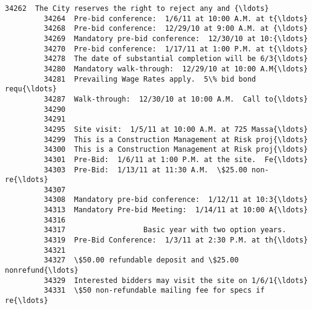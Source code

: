 \documentclass[11pt]{article}
\begin{document}
\begin{Verbatim}[commandchars=\\\{\}]
         34262  The City reserves the right to reject any and {\ldots}   
         34264  Pre-bid conference:  1/6/11 at 10:00 A.M. at t{\ldots}   
         34268  Pre-bid conference:  12/29/10 at 9:00 A.M. at {\ldots}   
         34269  Mandatory pre-bid conference:  12/30/10 at 10:{\ldots}   
         34270  Pre-bid conference:  1/17/11 at 1:00 P.M. at t{\ldots}   
         34278  The date of substantial completion will be 6/3{\ldots}   
         34280  Mandatory walk-through:  12/29/10 at 10:00 A.M{\ldots}   
         34281  Prevailing Wage Rates apply.  5\% bid bond requ{\ldots}   
         34287  Walk-through:  12/30/10 at 10:00 A.M.  Call to{\ldots}   
         34290                                                      
         34291                                                      
         34295  Site visit:  1/5/11 at 10:00 A.M. at 725 Massa{\ldots}   
         34299  This is a Construction Management at Risk proj{\ldots}   
         34300  This is a Construction Management at Risk proj{\ldots}   
         34301  Pre-Bid:  1/6/11 at 1:00 P.M. at the site.  Fe{\ldots}   
         34303  Pre-Bid:  1/13/11 at 11:30 A.M.  \$25.00 non-re{\ldots}   
         34307                                                      
         34308  Mandatory pre-bid conference:  1/12/11 at 10:3{\ldots}   
         34313  Mandatory Pre-bid Meeting:  1/14/11 at 10:00 A{\ldots}   
         34316                                                      
         34317                  Basic year with two option years.   
         34319  Pre-Bid Conference:  1/3/11 at 2:30 P.M. at th{\ldots}   
         34321                                                      
         34327  \$50.00 refundable deposit and \$25.00 nonrefund{\ldots}   
         34329  Interested bidders may visit the site on 1/6/1{\ldots}   
         34331  \$50 non-refundable mailing fee for specs if re{\ldots}   
         

\end{Verbatim}
\end{document}
